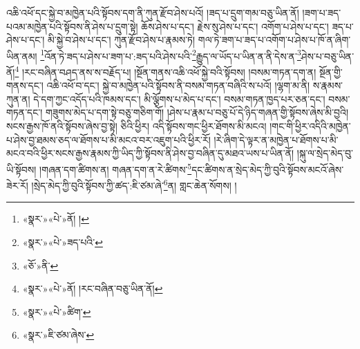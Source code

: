 འཆི་འཕོ་དང་སྐྱེ་བ་མཁྱེན་པའི་སྟོབས་དག་ནི་ཀུན་རྫོབ་ཤེས་པའོ། །ཟད་པ་དྲུག་གམ་བཅུ་ཡིན་ནོ། །ཟག་པ་ཟད་པའམ་མཁྱེན་པའི་སྟོབས་ནི་ཤེས་པ་དྲུག་སྟེ། ཆོས་ཤེས་པ་དང་། རྗེས་སུ་ཤེས་པ་དང་། འགོག་པ་ཤེས་པ་དང་། ཟད་པ་ཤེས་པ་དང་། མི་སྐྱེ་བ་ཤེས་པ་དང་། ཀུན་རྫོབ་ཤེས་པ་རྣམས་ཏེ། གལ་ཏེ་ཟག་པ་ཟད་པ་འགོག་པ་ཤེས་པ་ཁོ་ན་ཞིག་ཡིན་ནམ། \footnote{«སྣར་»«པེ་»ནོ། ། }འོན་ཏེ་ཟད་པ་ཤེས་པ་ཟག་པ་:ཟད་པའི་ཤེས་པའི་\footnote{«སྣར་»«པེ་»ཟད་པའི་}རྒྱུད་ལ་ཡོད་པ་ཡིན་ན་ནི་དེས་ན་\footnote{«ཅོ་»ནི་}ཤེས་པ་བཅུ་ཡིན་ནོ།\footnote{«སྣར་»«པེ་»ནོ། །རང་བཞིན་བཅུ་ཡིན་ནོ།} །རང་བཞིན་བཤད་ནས་ས་བརྗོད་པ། །སྔོན་གནས་འཆི་འཕོ་སྐྱེ་བའི་སྟོབས། །བསམ་གཏན་དག་ན། སྔོན་གྱི་གནས་དང་། འཆི་འཕོ་བ་དང་། སྐྱེ་བ་མཁྱེན་པའི་སྟོབས་ནི་བསམ་གཏན་བཞིའི་ས་པའོ། །ལྷག་མ་ནི། ས་རྣམས་ཀུན་ན། དེ་དག་ཀྱང་འདོད་པའི་ཁམས་དང་། མི་ལྕོགས་པ་མེད་པ་དང་། བསམ་གཏན་ཁྱད་པར་ཅན་དང་། བསམ་གཏན་དང་། གཟུགས་མེད་པ་དག་སྟེ་བཅུ་གཅིག་གོ། །ཤེས་པ་རྣམ་པ་བཅུ་པོ་དེ་ཉིད་གཞན་གྱི་སྟོབས་ཞེས་མི་བྱའི། སངས་རྒྱས་ཁོ་ནའི་སྟོབས་ཞེས་བྱ་སྟེ། ཅིའི་ཕྱིར། འདི་སྟོབས་གང་ཕྱིར་ཐོགས་མི་མངའ། །གང་གི་ཕྱིར་འདིའི་མཁྱེན་པ་ཤེས་བྱ་ཐམས་ཅད་ལ་ཐོགས་པ་མི་མངའ་བར་འཇུག་པའི་ཕྱིར་རོ། །རེ་ཞིག་དེ་ལྟར་ན་མཁྱེན་པ་ཐོགས་པ་མི་མངའ་བའི་ཕྱིར་སངས་རྒྱས་རྣམས་ཀྱི་ཡིད་ཀྱི་སྟོབས་ནི་ཤེས་བྱ་བཞིན་དུ་མཐའ་ཡས་པ་ཡིན་ནོ། །སྐུ་ལ་སྲེད་མེད་བུ་ཡི་སྟོབས། །གཞན་དག་ཚིགས་ན། གཞན་དག་ན་རེ་ཚིགས་\footnote{«སྣར་»«པེ་»ཚིག་}དང་ཚིགས་ན་སྲེད་མེད་ཀྱི་བུའི་སྟོབས་མངའོ་ཞེས་ཟེར་རོ། །སྲེད་མེད་ཀྱི་བུའི་སྟོབས་ཀྱི་ཚད་:ཇི་ཙམ་ཞེ་\footnote{«སྣར་»ཇི་ཙམ་ཞེས་}ན། གླང་ཆེན་སོགས། །
